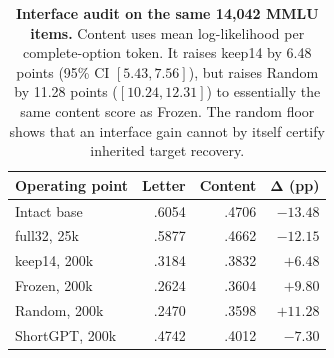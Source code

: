 \begin{table}[t]
\centering
\scriptsize
\setlength{\tabcolsep}{3.2pt}
\begin{tabular}{@{}lrrr@{}}
\toprule
\textbf{Operating point} & \textbf{Letter} & \textbf{Content} &
$\boldsymbol{\Delta}$ \textbf{(pp)} \\
\midrule
Intact base & .6054 & .4706 & $-13.48$ \\
full32, 25k & .5877 & .4662 & $-12.15$ \\
keep14, 200k & .3184 & .3832 & $+6.48$ \\
Frozen, 200k & .2624 & .3604 & $+9.80$ \\
Random, 200k & .2470 & .3598 & $+11.28$ \\
ShortGPT, 200k & .4742 & .4012 & $-7.30$ \\
\bottomrule
\end{tabular}
\caption{\textbf{Interface audit on the same 14,042 MMLU items.} Content uses
mean log-likelihood per complete-option token. It raises keep14 by 6.48 points
(95\% CI $[5.43,7.56]$), but raises Random by 11.28 points
($[10.24,12.31]$) to essentially the same content score as Frozen. The random
floor shows that an interface gain cannot by itself certify inherited target
recovery.}
\label{tab:interface-audit}
\end{table}
